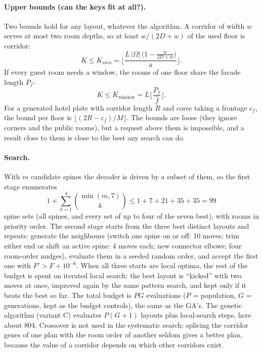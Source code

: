 \documentclass[10pt]{article}
\begin{document}
\paragraph{Upper bounds (can the keys fit at all?).} Two bounds hold for any layout, whatever the algorithm.
A corridor of width $w$ serves at most two room depths, so at least $w/(2D+w)$ of the used floor is corridor:
\[ K \le K_{\text{area}} = \Big\lfloor \frac{L\,|\Omega|\,\big(1 - \tfrac{w}{2D+w}\big)}{\bar a} \Big\rfloor . \]
If every guest room needs a window, the rooms of one floor share the facade length $P_f$:
\[ K \le K_{\text{window}} = L \Big\lfloor \frac{P_f}{\bar f} \Big\rfloor . \]
For a generated hotel plate with corridor length $R$ and cores taking a frontage $c_f$, the bound per floor is
$\lfloor (2R - c_f)/M \rfloor$. The bounds are loose (they ignore corners and the public rooms), but a request above them
is impossible, and a result close to them is close to the best any search can do.

\paragraph{Search.} With $m$ candidate spines the decoder is driven by a subset of them, so the first stage enumerates
\[ 1 + \sum_{k=1}^{4} \binom{\min(m,7)}{k} \le 1 + 7 + 21 + 35 + 35 = 99 \]
spine sets (all spines, and every set of up to four of the seven best), with rooms in priority order. The second stage
starts from the three best distinct layouts and repeats: generate the neighbours (switch one spine on or off: 10 moves; trim
either end or shift an active spine: 4 moves each; new connector elbows; four room-order nudges), evaluate them in a seeded
random order, and accept the first one with $F' > F + 10^{-6}$. When all three starts are local optima, the rest of the budget is spent on iterated local search: the best
layout is ``kicked'' with two moves at once, improved again by the same pattern search, and kept only if it beats
the best so far. The total budget is $PG$ evaluations ($P$ = population, $G$ = generations, kept as the budget
controls), the same as the GA's. The genetic algorithm (variant C)
evaluates $P(G+1)$ layouts plus local-search steps, here about 804. Crossover is not used in the systematic search:
splicing the corridor genes of one plan with the room order of another seldom gives a better plan, because the value of a
corridor depends on which other corridors exist.
\end{document}
